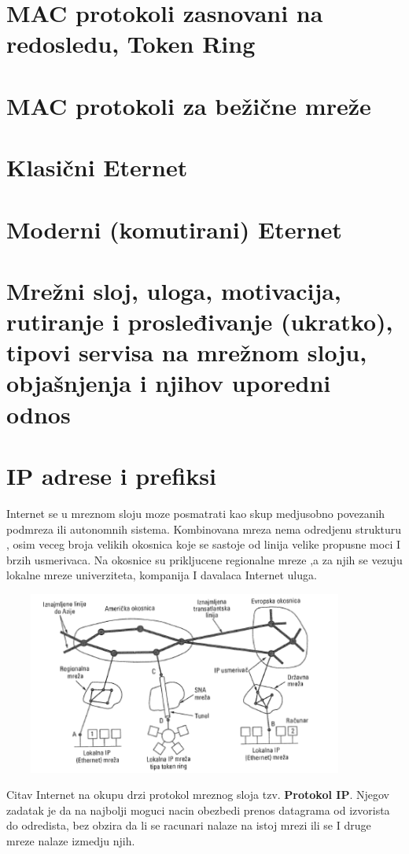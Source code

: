 \documentclass{article} %
\begin{document}
\section{MAC protokoli zasnovani na redosledu, Token Ring}
\section{MAC protokoli za bežične mreže}
\section{Klasični Eternet}
\section{Moderni (komutirani) Eternet}
\section{Mrežni sloj, uloga, motivacija, rutiranje i prosleđivanje (ukratko), tipovi servisa na mrežnom sloju, objašnjenja i njihov uporedni odnos}
\section{IP adrese i prefiksi}
Internet se u mreznom sloju moze posmatrati kao skup medjusobno povezanih podmreza ili autonomnih sistema. Kombinovana mreza nema odredjenu strukturu , osim veceg broja velikih okosnica koje se sastoje od linija velike propusne moci I brzih usmerivaca. Na okosnice su prikljucene regionalne mreze ,a za njih se vezuju lokalne mreze univerziteta, kompanija I davalaca Internet uluga.\\

\begin{center}
\includegraphics[width=12cm, height=6cm]{okosnica}\\
\end{center}
Citav Internet na okupu drzi protokol mreznog sloja tzv. \textbf{Protokol IP}. Njegov zadatak je da na najbolji moguci nacin obezbedi prenos datagrama od izvorista do odredista, bez obzira da li se racunari nalaze na istoj mrezi ili se I druge mreze nalaze izmedju njih.\\
\end{document}
